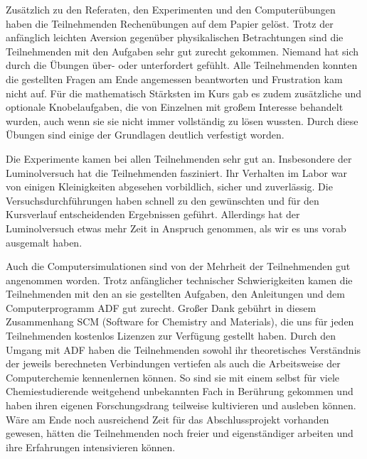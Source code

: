 \documentclass{scrartcl}
\begin{document}
Zus{\"a}tzlich zu den Referaten, den Experimenten und den Computer{\"u}bungen
haben die Teilnehmenden Rechen{\"u}bungen auf dem Papier gel{\"o}st. Trotz der
anf{\"a}nglich leichten Aversion gegen{\"u}ber physikalischen Betrachtungen
sind die Teilnehmenden mit den Aufgaben sehr gut zurecht gekommen. Niemand hat
sich durch die {\"U}bungen {\"u}ber- oder unterfordert gef{\"u}hlt. Alle
Teilnehmenden konnten die gestellten Fragen am Ende angemessen beantworten und
Frustration kam nicht auf. F{\"u}r die mathematisch St{\"a}rksten im Kurs gab
es zudem zus{\"a}tzliche und optionale Knobelaufgaben, die von Einzelnen mit
gro{\ss}em Interesse behandelt wurden, auch wenn sie sie nicht immer
vollst{\"a}ndig zu l{\"o}sen wussten. Durch diese {\"U}bungen sind einige der
Grundlagen deutlich verfestigt worden.
\medskip

Die Experimente kamen bei allen Teilnehmenden sehr gut an. Insbesondere der Luminolversuch hat die Teilnehmenden fasziniert. Ihr Verhalten im Labor war von einigen Kleinigkeiten abgesehen vorbildlich, sicher und zuverl{\"a}ssig. Die Versuchsdurchf{\"u}hrungen haben schnell zu den gew{\"u}nschten und f{\"u}r den Kursverlauf entscheidenden Ergebnissen gef{\"u}hrt. Allerdings hat der Luminolversuch etwas mehr Zeit in Anspruch genommen, als wir es uns vorab ausgemalt haben.
\medskip

Auch die Computersimulationen sind von der Mehrheit der Teilnehmenden gut angenommen worden. Trotz anf{\"a}nglicher technischer Schwierigkeiten kamen die Teilnehmenden mit den an sie gestellten Aufgaben, den Anleitungen und dem Computerprogramm ADF gut zurecht. Gro{\ss}er Dank geb{\"u}hrt in diesem Zusammenhang
SCM (Software for Chemistry and Materials),
die uns f{\"u}r jeden Teilnehmenden kostenlos Lizenzen zur Verf{\"u}gung gestellt haben. Durch den Umgang mit ADF haben die Teilnehmenden sowohl ihr theoretisches Verst{\"a}ndnis der jeweils berechneten Verbindungen vertiefen als auch die Arbeitsweise der Computerchemie kennenlernen k{\"o}nnen. So sind sie mit einem selbst f{\"u}r viele Chemiestudierende weitgehend unbekannten Fach in Ber{\"u}hrung gekommen und haben ihren eigenen Forschungsdrang teilweise kultivieren und ausleben k{\"o}nnen. W{\"a}re am Ende noch ausreichend Zeit f{\"u}r das Abschlussprojekt vorhanden gewesen, h{\"a}tten die Teilnehmenden noch freier und eigenst{\"a}ndiger arbeiten und ihre Erfahrungen intensivieren k{\"o}nnen.\medskip
\end{document}
